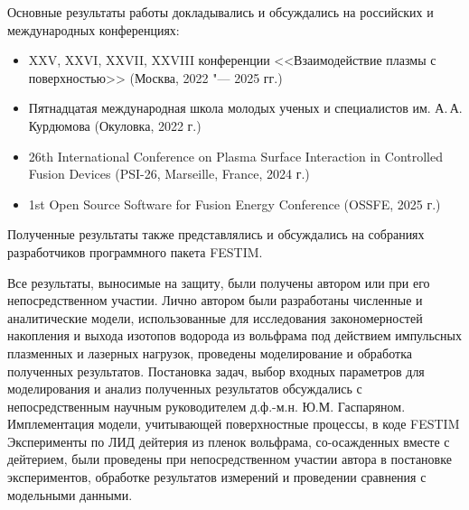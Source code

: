 {\probation}
Основные результаты работы докладывались и обсуждались на российских и международных конференциях:
\begin{itemize}
    \item XXV, XXVI, XXVII, XXVIII конференции <<Взаимодействие плазмы с поверхностью>> (Москва, 2022 "--- 2025 гг.)
    \item Пятнадцатая международная школа молодых ученых и специалистов им. А.\,А. Курдюмова (Окуловка, 2022 г.)
    \item 26th International Conference on Plasma Surface Interaction in Controlled Fusion Devices (PSI-26, Marseille, France, 2024 г.)
    \item 1st Open Source Software for Fusion Energy Conference (OSSFE, 2025 г.) 
\end{itemize}

Полученные результаты также представлялись и обсуждались на собраниях разработчиков программного пакета FESTIM.

{\contribution} Все результаты, выносимые на защиту, были получены автором или при его непосредственном участии. Лично автором были разработаны 
численные и аналитические модели, использованные для исследования закономерностей накопления и выхода изотопов водорода из вольфрама под действием 
импульсных плазменных и лазерных нагрузок, проведены моделирование и обработка полученных результатов. Постановка задач, выбор входных параметров для моделирования 
и анализ полученных результатов обсуждались с непосредственным научным руководителем д.ф.-м.н. Ю.М. Гаспаряном. Имплементация модели, учитывающей 
поверхностные процессы, в коде FESTIM  Эксперименты по ЛИД дейтерия из пленок вольфрама, со-осажденных вместе с дейтерием,
были проведены  при непосредственном участии автора в постановке экспериментов, обработке результатов измерений 
и проведении сравнения с модельными данными.

